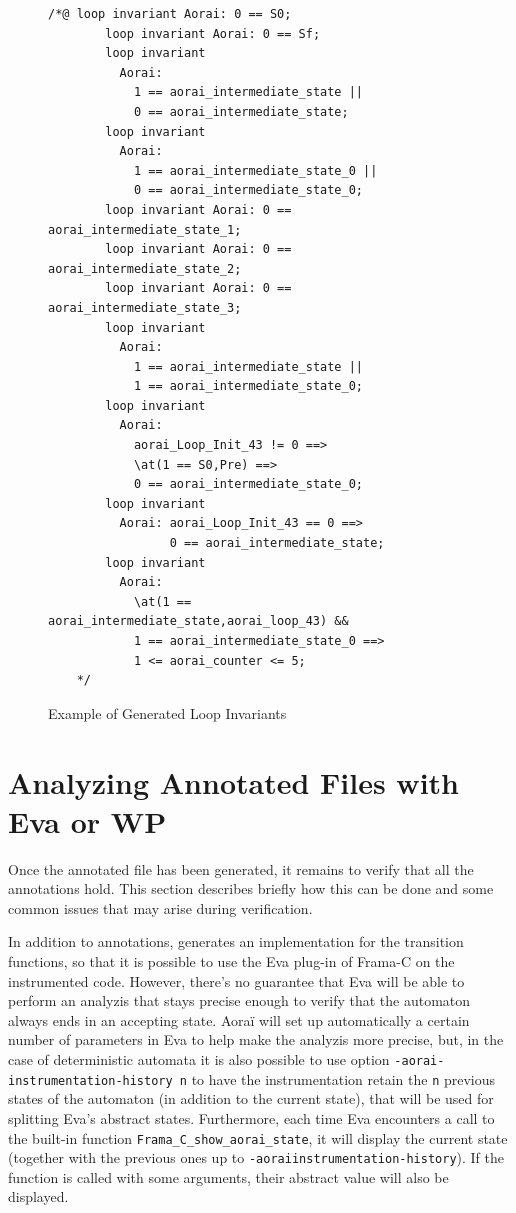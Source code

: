 \documentclass{frama-c-book}
\begin{document}
\begin{figure}
\begin{lstlisting}[language=ACSL]
   /*@ loop invariant Aorai: 0 == S0;
        loop invariant Aorai: 0 == Sf;
        loop invariant
          Aorai:
            1 == aorai_intermediate_state ||
            0 == aorai_intermediate_state;
        loop invariant
          Aorai:
            1 == aorai_intermediate_state_0 ||
            0 == aorai_intermediate_state_0;
        loop invariant Aorai: 0 == aorai_intermediate_state_1;
        loop invariant Aorai: 0 == aorai_intermediate_state_2;
        loop invariant Aorai: 0 == aorai_intermediate_state_3;
        loop invariant
          Aorai:
            1 == aorai_intermediate_state ||
            1 == aorai_intermediate_state_0;
        loop invariant
          Aorai:
            aorai_Loop_Init_43 != 0 ==>
            \at(1 == S0,Pre) ==>
            0 == aorai_intermediate_state_0;
        loop invariant
          Aorai: aorai_Loop_Init_43 == 0 ==>
                 0 == aorai_intermediate_state;
        loop invariant
          Aorai:
            \at(1 == aorai_intermediate_state,aorai_loop_43) &&
            1 == aorai_intermediate_state_0 ==>
            1 <= aorai_counter <= 5;
    */
\end{lstlisting}
  \caption{Example of Generated Loop Invariants}
  \label{FigGeneratedLoopInvariants}
\end{figure}

\section{Analyzing Annotated Files with Eva or WP}
\label{collaboration}
Once the annotated file has been generated, it remains to verify that all the
annotations hold. This section describes briefly how this can be done and some
common issues that may arise during verification.

In addition to annotations, \aorai generates an implementation for the transition
functions, so that it is possible to use the Eva plug-in of Frama-C on the
instrumented code. However, there's no guarantee that Eva will be able to
perform an analyzis that stays precise enough to verify that the automaton
always ends in an accepting state. Aoraï will set up automatically a certain number
of parameters in Eva to help make the analyzis more precise, but,
in the case of deterministic automata it is also possible
to use option \texttt{-aorai-instrumentation-history n} to have the instrumentation
retain the \texttt{n} previous states of the automaton (in addition to the
current state), that will be used for splitting Eva's abstract states. Furthermore,
each time Eva encounters a call to the
built-in function \texttt{Frama\_C\_show\_aorai\_state}, it will display the current
state (together with the previous ones up to \texttt{-aorai\-instrumentation-history}).
If the function is called with some arguments, their abstract value will also be
displayed.
\end{document}
